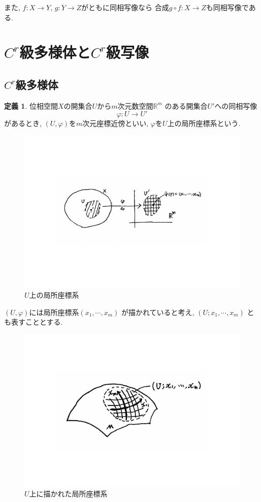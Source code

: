 \documentclass[a4j,12pt]{jarticle}
\theoremstyle{definition}
\newtheorem{definition}[theorem]{定義}
\begin{document}
また, $f:X\to Y$, $g:Y\to Z$がともに同相写像なら
合成$g\circ f:X\to Z$も同相写像である. 
\newpage
%
\section{$C^r$級多様体と$C^r$級写像}
\subsection{$C^r$級多様体}
\begin{definition}
    位相空間$X$の開集合$U$から$m$次元数空間$\mathbb{R}^m$
    のある開集合$U'$への同相写像
    $$\varphi:U\rightarrow U'$$
    があるとき, $(U, \varphi)$を$m$次元座標近傍といい, 
    $\varphi$を$U$上の局所座標系という. 
\end{definition}
\begin{figure}[H]
    \centering
    \includegraphics[keepaspectratio, scale=0.6]
    {coNeighborhood.pdf}
    \caption{$U$上の局所座標系}
    \label{coNeighborhood}
   \end{figure}
$(U,\varphi)$には局所座標系$(x_1, \cdots ,x_m)$
    が描かれていると考え, $(U;x_1, \cdots ,x_m)$
    とも表すこととする. 
    \begin{figure}[H]
        \centering
        \includegraphics[keepaspectratio, scale=0.5]{DrawnLocalCoSys.pdf}
        \caption{$U$上に描かれた局所座標系}
        \label{DrawnLocalCoSysd}
       \end{figure}
\end{document}
